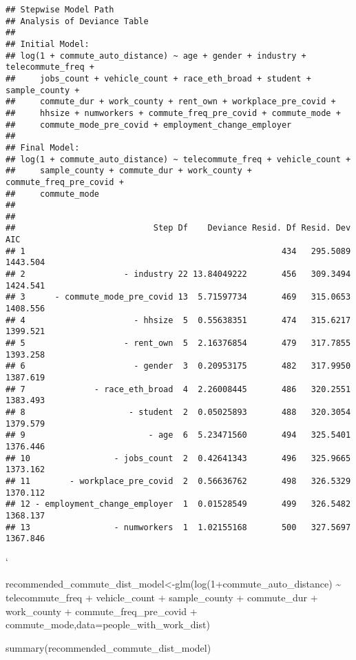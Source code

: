 \documentclass[
]{article}
\newenvironment{Shaded}{\begin{snugshade}}{\end{snugshade}}
\newcommand{\AttributeTok}[1]{\textcolor[rgb]{0.77,0.63,0.00}{#1}}
\newcommand{\DecValTok}[1]{\textcolor[rgb]{0.00,0.00,0.81}{#1}}
\newcommand{\FunctionTok}[1]{\textcolor[rgb]{0.00,0.00,0.00}{#1}}
\newcommand{\NormalTok}[1]{#1}
\newcommand{\OtherTok}[1]{\textcolor[rgb]{0.56,0.35,0.01}{#1}}
\newcommand{\SpecialCharTok}[1]{\textcolor[rgb]{0.00,0.00,0.00}{#1}}
\begin{document}
\begin{verbatim}
## Stepwise Model Path 
## Analysis of Deviance Table
## 
## Initial Model:
## log(1 + commute_auto_distance) ~ age + gender + industry + telecommute_freq + 
##     jobs_count + vehicle_count + race_eth_broad + student + sample_county + 
##     commute_dur + work_county + rent_own + workplace_pre_covid + 
##     hhsize + numworkers + commute_freq_pre_covid + commute_mode + 
##     commute_mode_pre_covid + employment_change_employer
## 
## Final Model:
## log(1 + commute_auto_distance) ~ telecommute_freq + vehicle_count + 
##     sample_county + commute_dur + work_county + commute_freq_pre_covid + 
##     commute_mode
## 
## 
##                            Step Df    Deviance Resid. Df Resid. Dev      AIC
## 1                                                    434   295.5089 1443.504
## 2                    - industry 22 13.84049222       456   309.3494 1424.541
## 3      - commute_mode_pre_covid 13  5.71597734       469   315.0653 1408.556
## 4                      - hhsize  5  0.55638351       474   315.6217 1399.521
## 5                    - rent_own  5  2.16376854       479   317.7855 1393.258
## 6                      - gender  3  0.20953175       482   317.9950 1387.619
## 7              - race_eth_broad  4  2.26008445       486   320.2551 1383.493
## 8                     - student  2  0.05025893       488   320.3054 1379.579
## 9                         - age  6  5.23471560       494   325.5401 1376.446
## 10                 - jobs_count  2  0.42641343       496   325.9665 1373.162
## 11        - workplace_pre_covid  2  0.56636762       498   326.5329 1370.112
## 12 - employment_change_employer  1  0.01528549       499   326.5482 1368.137
## 13                 - numworkers  1  1.02155168       500   327.5697 1367.846
\end{verbatim}

`

\begin{Shaded}
\begin{Highlighting}[]
\NormalTok{recommended\_commute\_dist\_model}\OtherTok{\textless{}{-}}\FunctionTok{glm}\NormalTok{(}\FunctionTok{log}\NormalTok{(}\DecValTok{1}\SpecialCharTok{+}\NormalTok{commute\_auto\_distance) }\SpecialCharTok{\textasciitilde{}}\NormalTok{ telecommute\_freq }\SpecialCharTok{+}\NormalTok{ vehicle\_count }\SpecialCharTok{+} 
\NormalTok{    sample\_county }\SpecialCharTok{+}\NormalTok{ commute\_dur }\SpecialCharTok{+}\NormalTok{ work\_county }\SpecialCharTok{+}\NormalTok{ commute\_freq\_pre\_covid }\SpecialCharTok{+} 
\NormalTok{    commute\_mode,}\AttributeTok{data=}\NormalTok{people\_with\_work\_dist)}

\FunctionTok{summary}\NormalTok{(recommended\_commute\_dist\_model)}
\end{Highlighting}
\end{Shaded}
\end{document}
